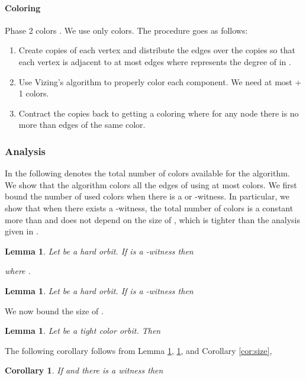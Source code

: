 \documentclass[titlepage, 11pt]{article}
\newtheorem{lemma}[theorem]{Lemma}
\newtheorem{corollary}[theorem]{Corollary}
\begin{document}
\paragraph{Coloring } \label{sec:simple}
Phase 2 colors . We use  only  colors. The procedure goes as follows: 
\begin{enumerate}
\item Create  copies of each vertex  and distribute the edges over the copies so that each vertex is adjacent to at most 
 edges where  represents the degree of  in .
\item Use Vizing's algorithm to properly color each component. We need at most  + 1 colors.
\item Contract the copies back to  getting a coloring where for any node  there is no more than
 edges of the same color. 
\end{enumerate}



\subsubsection{Analysis}\label{sec:analysis}
In the following  denotes the total number of colors available for the algorithm. We show that the algorithm colors all the edges of  using at most  colors.
We first bound the number of used colors when there is a  or -witness.
In particular, we show that when there exists a -witness, 
the total number of colors is a constant more than  and does not depend on the size of ,
which is tighter than the analysis given in \cite{sanders05}.

\begin{lemma}\label{lemma:witness1}
Let  be a hard orbit. If  is a -witness then

where  . 
\end{lemma}

\begin{lemma}\label{lemma:witness2}
Let  be a hard orbit. If  is a -witness then 
\end{lemma}

We now bound the size of .

\begin{lemma} \label{lemma:size}
Let  be a tight color orbit. Then  
\end{lemma} 

The following corollary follows from Lemma \ref{lemma:witness1}, \ref{lemma:witness2}, 
and Corollary \ref{cor:size}, 

\begin{corollary}\label{cor:cwitness}
If  and 
there is a witness then 
\end{corollary}
\end{document}
